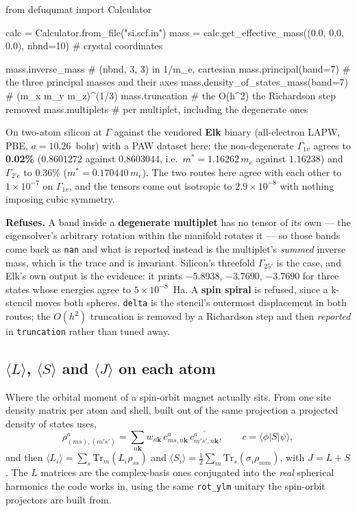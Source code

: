 \documentclass[11pt,a4paper]{article}
\newcommand{\code}[1]{\texttt{\small #1}}
\begin{document}
\begin{pycode}
from defuqumat import Calculator

calc = Calculator.from_file("si.scf.in")
mass = calc.get_effective_mass((0.0, 0.0, 0.0), nbnd=10)  # crystal coordinates

mass.inverse_mass          # (nbnd, 3, 3) in 1/m_e, cartesian
mass.principal(band=7)     # the three principal masses and their axes
mass.density_of_states_mass(band=7)   # (m_x m_y m_z)^(1/3)
mass.truncation            # the O(h^2) the Richardson step removed
mass.multiplets            # per multiplet, including the degenerate ones
\end{pycode}

On two-atom silicon at $\Gamma$ against the vendored \textbf{Elk} binary
(all-electron LAPW, PBE, $a = 10.26$~bohr) with a PAW dataset here: the
non-degenerate $\Gamma_{1v}$ agrees to \textbf{0.02\%} ($0.8601272$ against
$0.8603044$, i.e.\ $m^* = 1.16262\,m_e$ against $1.16238$) and $\Gamma_{2'c}$ to
0.36\% ($m^* = 0.170440\,m_e$). The two routes here agree with each other to
$1\times10^{-7}$ on $\Gamma_{1v}$, and the tensors come out isotropic to
$2.9\times10^{-8}$ with nothing imposing cubic symmetry.

\begin{refuses}
\textbf{Refuses.} A band inside a \textbf{degenerate multiplet} has no tensor of
its own --- the eigensolver's arbitrary rotation within the manifold rotates it
--- so those bands come back as \code{nan} and what is reported instead is the
multiplet's \emph{summed} inverse mass, which is the trace and is invariant.
Silicon's threefold $\Gamma_{25'}$ is the case, and Elk's own output is the
evidence: it prints $-5.8938$, $-3.7690$, $-3.7690$ for three states whose
energies agree to $5\times10^{-8}$~Ha. A \textbf{spin spiral} is refused, since
a k-stencil moves both spheres. \code{delta} is the stencil's outermost
displacement in both routes; the $O(h^2)$ truncation is removed by a Richardson
step and then \emph{reported} in \code{truncation} rather than tuned away.
\end{refuses}

\subsection{\texorpdfstring{$\langle L\rangle$, $\langle S\rangle$ and $\langle J\rangle$ on each atom}{L, S and J on each atom}}

Where the orbital moment of a spin-orbit magnet actually sits. From one site
density matrix per atom and shell, built out of the same projection a projected
density of states uses,
\begin{equation*}
  \rho^a_{(ms),(m's')} = \sum_{n\mathbf k} w_{n\mathbf k}\,
     c^a_{ms,n\mathbf k}\, \overline{c^a_{m's',n\mathbf k}},
  \qquad c = \langle \phi | S | \psi \rangle,
\end{equation*}
and then $\langle L_i\rangle = \sum_s \mathrm{Tr}_m (L_i \rho_{ss})$ and
$\langle S_i \rangle = \tfrac12 \sum_m \mathrm{Tr}_s (\sigma_i \rho_{mm})$, with
$J = L + S$. The $L$ matrices are the complex-basis ones conjugated into the
\emph{real} spherical harmonics the code works in, using the same \code{rot\_ylm}
unitary the spin-orbit projectors are built from.
\end{document}
